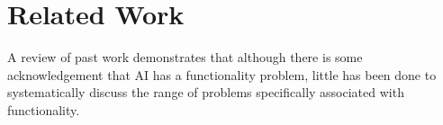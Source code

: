 \documentclass[acmconf,manuscript,screen,natbib=true]{acmart}
\begin{document}





\section{Related Work}


A review of past work demonstrates that although there is some acknowledgement that AI has a functionality problem, little has been done to systematically discuss the range of problems specifically associated with functionality.%
\end{document}
